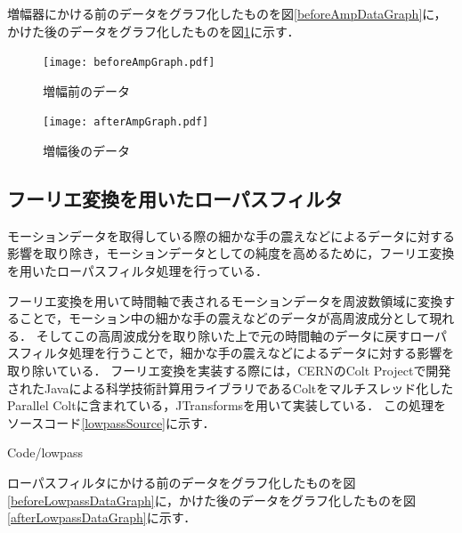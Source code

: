 \documentclass[11pt]{jreport}
\renewcommand{\slash}{/}
\begin{document}
        増幅器にかける前のデータをグラフ化したものを図\ref{beforeAmpDataGraph}に，かけた後のデータをグラフ化したものを図\ref{afterAmpDataGraph}に示す．

        \begin{figure}[btp]
            \begin{minipage}{0.5\hsize}
                \begin{center}
                    \texttt{[image: beforeAmpGraph.pdf]}
                \end{center}
                \caption{増幅前のデータ}
                \label{beforeAmpDataGraph}
            \end{minipage}
            \begin{minipage}{0.5\hsize}
                \begin{center}
                    \texttt{[image: afterAmpGraph.pdf]}
                \end{center}
                \caption{増幅後のデータ}
                \label{afterAmpDataGraph}
            \end{minipage}
        \end{figure}

        \subsection{フーリエ変換を用いたローパスフィルタ}
        モーションデータを取得している際の細かな手の震えなどによるデータに対する影響を取り除き，モーションデータとしての純度を高めるために，フーリエ変換を用いたローパスフィルタ処理を行っている．

        フーリエ変換を用いて時間軸で表されるモーションデータを周波数領域に変換することで，モーション中の細かな手の震えなどのデータが高周波成分として現れる．
        そしてこの高周波成分を取り除いた上で元の時間軸のデータに戻すローパスフィルタ処理を行うことで，細かな手の震えなどによるデータに対する影響を取り除いている．
        フーリエ変換を実装する際には，CERNのColt Project\cite{coltproj}で開発されたJavaによる科学技術計算用ライブラリであるColt\cite{colt}をマルチスレッド化したParallel Colt\cite{parallelcolt}に含まれている，JTransforms\cite{jtransforms}を用いて実装している．
        この処理をソースコード\ref{lowpassSource}に示す．

        
        {Code\slash lowpass}

        ローパスフィルタにかける前のデータをグラフ化したものを図\ref{beforeLowpassDataGraph}に，かけた後のデータをグラフ化したものを図\ref{afterLowpassDataGraph}に示す．
\end{document}
